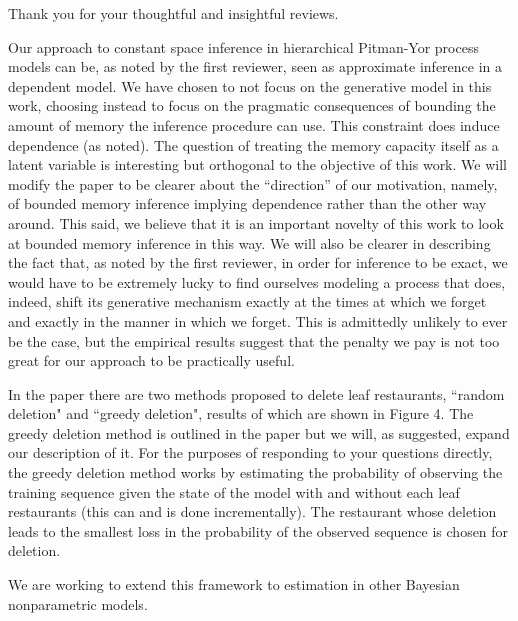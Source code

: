 \documentclass[11pt]{amsart}
\begin{document}
Thank you for your thoughtful and insightful reviews.

Our approach to constant space inference in hierarchical Pitman-Yor process models can be, as noted by the first reviewer, seen as approximate inference in a dependent model.  We have chosen to not focus on the generative model in this work, choosing instead to focus on the pragmatic consequences of bounding the amount of memory the inference procedure can use.  This constraint does induce dependence (as noted).  The question of treating the memory capacity itself as a latent variable is interesting but orthogonal to the objective of this work.  We will modify the paper to be clearer about the ``direction'' of our motivation, namely, of bounded memory inference implying dependence rather than the other way around.  This said, we believe that it is an important novelty of this work to look at bounded memory inference in this way.  We will also be clearer in describing the fact that, as noted by the first reviewer, in order for inference to be exact, we would have to be extremely lucky to find ourselves modeling a process that does, indeed, shift its generative mechanism exactly at the times at which we forget and exactly in the manner in which we forget.  This is admittedly unlikely to ever be the case, but the empirical results suggest that the penalty we pay is not too great for our approach to be practically useful.



In the paper there are two methods proposed to delete leaf restaurants, ``random deletion" and ``greedy deletion", results of which are shown in Figure 4.  The greedy deletion method is outlined in the paper but we will, as suggested, expand our description of it.   For the purposes of responding to your questions directly, the greedy deletion method works by estimating the probability of observing the training sequence given the state of the model with and without each leaf restaurants (this can and is done incrementally).  The restaurant whose deletion leads to the smallest loss in the probability of the observed sequence is chosen for deletion. 

We are working to extend this framework to estimation in other Bayesian nonparametric models.
\end{document}
